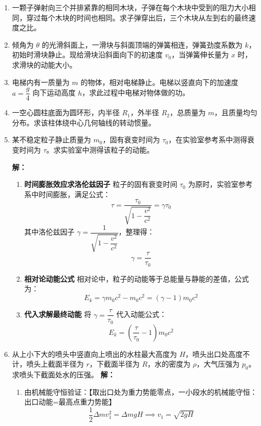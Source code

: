 \documentclass[11pt,a4paper]{article}
\begin{document}
\begin{enumerate}
因此，两弹簧弹力大小之比为：
\[
\frac{F_1}{F_2} = \frac{3m\omega^2 r}{2m\omega^2 r} = \frac{3}{2}
\]
    \item 一颗子弹射向三个并排紧靠的相同木块，子弹在每个木块中受到的阻力大小相同，穿过每个木块的时间也相同。求子弹穿出后，三个木块从左到右的最终速度之比。

    \item 倾角为 \( \theta \) 的光滑斜面上，一滑块与斜面顶端的弹簧相连，弹簧劲度系数为 \( k \)，初始时滑块静止。现给滑块沿斜面向下的初速度 \( v_0 \)，当弹簧伸长量为 \( x \) 时，求滑块的动能大小。

    \item 电梯内有一质量为 \( m \) 的物体，相对电梯静止。电梯以竖直向下的加速度 \( a = \dfrac{g}{4} \) 向下运动高度 \( h \)，求此过程中电梯对物体做的功。

    \item 一空心圆柱底面为圆环形，内半径 \( R_1 \)，外半径 \( R_2 \)，总质量为 \( m \)，且质量均匀分布。求该柱体绕中心几何轴线的转动惯量。

    \item 某不稳定粒子静止质量为 \( m_0 \)，固有衰变时间为 \( \tau_0 \)，在实验室参考系中测得衰变时间为 \( \tau \)。求实验室中测得该粒子的动能。

\vspace{0.5em}
\textbf{解：}
\begin{enumerate}
    \item \textbf{时间膨胀效应求洛伦兹因子}
    粒子的固有衰变时间 \( \tau_0 \) 为原时，实验室参考系中时间膨胀，满足公式：
    \[
    \tau = \frac{\tau_0}{\sqrt{1-\dfrac{v^2}{c^2}}} = \gamma \tau_0
    \]
    其中洛伦兹因子 \( \gamma = \dfrac{1}{\sqrt{1-\dfrac{v^2}{c^2}}} \)，整理得：
    \[
    \gamma = \frac{\tau}{\tau_0}
    \]

    \item \textbf{相对论动能公式}
    相对论中，粒子的动能等于总能量与静能的差值，公式为：
    \[
    E_k = \gamma m_0 c^2 - m_0 c^2 = (\gamma - 1) m_0 c^2
    \]

    \item \textbf{代入求解最终动能}
    将 \( \gamma = \dfrac{\tau}{\tau_0} \) 代入动能公式：
    \[
    E_k = \left( \frac{\tau}{\tau_0} - 1 \right) m_0 c^2
    \]
\end{enumerate}
    \item 从上小下大的喷头中竖直向上喷出的水柱最大高度为 \( H \)，喷头出口处高度不计，喷头上截面半径为 \( r \)，下截面半径为 \( R \)，水的密度为 \( \rho \)，大气压强为 \( p_0 \)。求喷头下截面处水的压强。
\textbf{解：}
\begin{enumerate}
    \item 由机械能守恒验证：【取出口处为重力势能零点，一小段水的机械能守恒：出口动能=最高点重力势能】
    \[
    \frac{1}{2}\Delta m v_1^2 = \Delta m g H \implies v_1 = \sqrt{2gH}
    \]


\end{enumerate}
\end{enumerate}
\end{document}
